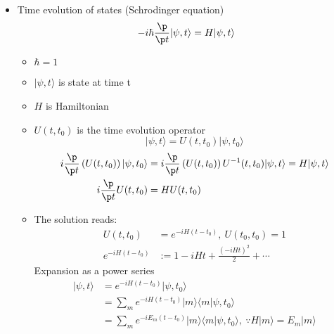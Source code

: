 \documentclass[cplx.tex]{subfiles}
\begin{document}
\begin{itemize}
\begin{itemize}
\begin{align}
                \end{align}
        \end{itemize}
    \item Time evolution of states (Schrodinger equation)
        \begin{equation}
            -i\hbar \frac{\p}{\p t}|\psi,t\rangle = H|\psi,t\rangle
        \end{equation}
        \begin{itemize}
            \item $\hbar = 1$
            \item $|\psi,t\rangle$ is state at time t
            \item $H$ is Hamiltonian
            \item $U(t,t_0)$ is the time evolution operator
                \begin{equation}
                    |\psi,t\rangle = U(t,t_0)|\psi,t_0\rangle
                \end{equation}
                \begin{align}
                    i\frac{\p}{\p t}\left(U(t,t_0)\right) |\psi,t_0\rangle &= i\frac{\p}{\p t} \left(U(t,t_0)\right)U^{-1}(t,t_0)|\psi,t\rangle = H|\psi,t\rangle \\
                    i\frac{\p}{\p t}U(t,t_0) &= HU(t,t_0) 
                \end{align}
            \item The solution reads:
                \begin{align}
                    U(t,t_0) &= e^{-iH(t-t_0)},~ U(t_0,t_0) = 1 \\
                    e^{-iH(t-t_0)} &:= 1 - iHt + \frac{(-iHt)^2}{2} + \cdots
                \end{align}
                Expansion as a power series
                \begin{align}
                    |\psi,t\rangle &= e^{-iH(t-t_0)}|\psi,t_0\rangle \\
                                   &= \sum_m e^{-iH(t-t_0)}|m\rangle\langle m|\psi,t_0\rangle \\
                                   &= \sum_m e^{-iE_m(t-t_0)}|m\rangle\langle m|\psi,t_0\rangle, ~\because H|m\rangle = E_m|m\rangle
                \end{align}
        \end{itemize}
\end{itemize}
\end{document}

